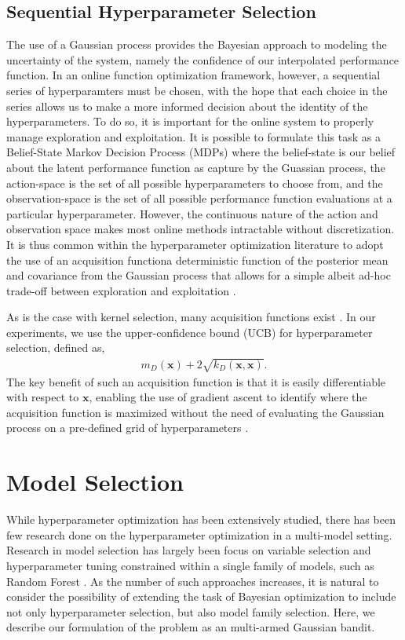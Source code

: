 \documentclass{article}
\newcommand{\x}{\mathbf{x}}
\begin{document}
\subsection{Sequential Hyperparameter Selection}
The use of a Gaussian process provides the Bayesian approach to modeling the uncertainty of the system, namely the confidence of our interpolated performance function. In an online function optimization framework, however, a sequential series of hyperparamters must be chosen, with the hope that each choice in the series allows us to make a more informed decision about the identity of the hyperparameters. To do so, it is important for the online system to properly manage exploration and exploitation. It is possible to formulate this task as a Belief-State Markov Decision Process (MDPs) where the belief-state is our belief about the latent performance function as capture by the Guassian process, the action-space is the set of all possible hyperparameters to choose from, and the observation-space is the set of all possible performance function evaluations at a particular hyperparameter. However, the continuous nature of the action and observation space makes most online methods intractable without discretization. It is thus common within the hyperparameter optimization literature to adopt the use of an acquisition function\textemdash a deterministic function of the posterior mean and covariance from the Gaussian process that allows for a simple albeit ad-hoc trade-off between exploration and exploitation \cite{adams:practical}. 

As is the case with kernel selection, many acquisition functions exist \cite{garnett}. In our experiments, we use the upper-confidence bound (UCB) for hyperparameter selection, defined as,
\begin{align}
  m_D(\x) + 2\sqrt{k_D(\x, \x)}.
\end{align}
The key benefit of such an acquisition function is that it is easily differentiable with respect to $\x$, enabling the use of gradient ascent to identify where the acquisition function is maximized without the need of evaluating the Gaussian process on a pre-defined grid of hyperparameters \cite{adams:practical}. 

\section{Model Selection}
While hyperparameter optimization has been extensively studied, there has been few research done on the hyperparameter optimization in a multi-model setting. Research in model selection has largely been focus on variable selection and hyperparameter tuning constrained within a single family of models, such as Random Forest \cite{deepfeature}. As the number of such approaches increases, it is natural to consider the possibility of extending the task of Bayesian optimization to include not only hyperparameter selection, but also model family selection. Here, we describe our formulation of the problem as an multi-armed Gaussian bandit. 
\end{document}
